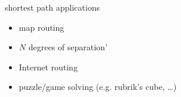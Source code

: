 \begin{frame}{shortest path applications}
\begin{itemize}
\item map routing
\item $N$ degrees of separation'
\item Internet routing
\item puzzle/game solving (e.g. rubrik's cube, \ldots)
\end{itemize}
\end{frame}
